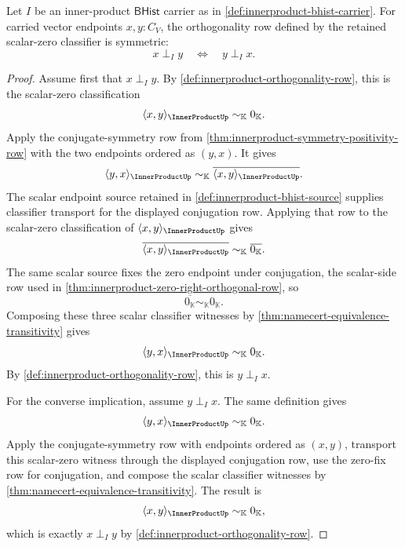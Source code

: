 \begin{theorem}
\label{thm:innerproduct-orthogonality-symmetry-row}
Let $I$ be an inner-product $\mathsf{BHist}$ carrier as in
\autoref{def:innerproduct-bhist-carrier}. For carried vector endpoints
$x,y:C_V$, the orthogonality row defined by the retained scalar-zero
classifier is symmetric:
$$
x\perp_I y
\quad\Longleftrightarrow\quad
y\perp_I x.
$$
\end{theorem}
\begin{proof}
Assume first that $x\perp_I y$. By
\autoref{def:innerproduct-orthogonality-row}, this is the scalar-zero
classification
$$
\langle x,y\rangle_{\InnerProductUp}\sim_{\mathbb{K}}0_{\mathbb{K}}.
$$
Apply the conjugate-symmetry row from
\autoref{thm:innerproduct-symmetry-positivity-row} with the two endpoints
ordered as $(y,x)$. It gives
$$
\langle y,x\rangle_{\InnerProductUp}
\sim_{\mathbb{K}}
\overline{\langle x,y\rangle_{\InnerProductUp}}.
$$
The scalar endpoint source retained in
\autoref{def:innerproduct-bhist-source} supplies classifier transport for the
displayed conjugation row. Applying that row to the scalar-zero classification
of $\langle x,y\rangle_{\InnerProductUp}$ gives
$$
\overline{\langle x,y\rangle_{\InnerProductUp}}
\sim_{\mathbb{K}}
\overline{0_{\mathbb{K}}}.
$$
The same scalar source fixes the zero endpoint under conjugation, the
scalar-side row used in \autoref{thm:innerproduct-zero-right-orthogonal-row},
so
$$
\overline{0_{\mathbb{K}}}\sim_{\mathbb{K}}0_{\mathbb{K}}.
$$
Composing these three scalar classifier witnesses by
\autoref{thm:namecert-equivalence-transitivity} gives
$$
\langle y,x\rangle_{\InnerProductUp}\sim_{\mathbb{K}}0_{\mathbb{K}}.
$$
By \autoref{def:innerproduct-orthogonality-row}, this is $y\perp_I x$.

For the converse implication, assume $y\perp_I x$. The same definition gives
$$
\langle y,x\rangle_{\InnerProductUp}\sim_{\mathbb{K}}0_{\mathbb{K}}.
$$
Apply the conjugate-symmetry row with endpoints ordered as $(x,y)$, transport
this scalar-zero witness through the displayed conjugation row, use the
zero-fix row for conjugation, and compose the scalar classifier witnesses by
\autoref{thm:namecert-equivalence-transitivity}. The result is
$$
\langle x,y\rangle_{\InnerProductUp}\sim_{\mathbb{K}}0_{\mathbb{K}},
$$
which is exactly $x\perp_I y$ by
\autoref{def:innerproduct-orthogonality-row}.
\end{proof}

